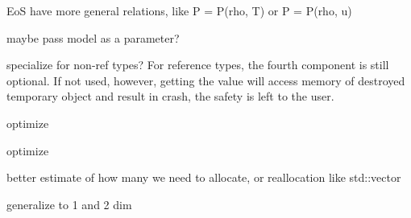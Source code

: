 
\begin{DoxyRefList}
\item[\label{todo__todo000018}%
\hypertarget{todo__todo000018}{}%
Member \hyperlink{classAbstract_1_1Eos_ab21906f5fc78370a10cdbf97983544ea}{Abstract\+:\+:Eos\+:\+:get\+Pressure} (Array\+View$<$ const Float $>$ rho, Array\+View$<$ const Float $>$ u, Array\+View$<$ Float $>$ p)=0]EoS have more general relations, like P = P(rho, T) or P = P(rho, u) 

maybe pass model as a parameter?  
\item[\label{todo__todo000008}%
\hypertarget{todo__todo000008}{}%
Class \hyperlink{classBasicIndices}{Basic\+Indices$<$ T $>$} ]specialize for non-\/ref types? For reference types, the fourth component is still optional. If not used, however, getting the value will access memory of destroyed temporary object and result in crash, the safety is left to the user.  
\item[\label{todo__todo000012}%
\hypertarget{todo__todo000012}{}%
Member \hyperlink{classBasicVector_3_01double_01_4_a9ef4881becf50b273cfae52c89fcd5fc}{Basic\+Vector$<$ double $>$\+:\+:dot} (const \hyperlink{classBasicVector}{Basic\+Vector} \&other) const]optimize  
\item[\label{todo__todo000011}%
\hypertarget{todo__todo000011}{}%
Member \hyperlink{classBasicVector_3_01double_01_4_a89893ab07524d683177877fc3f1a34d6}{Basic\+Vector$<$ double $>$\+:\+:operator==} (const \hyperlink{classBasicVector}{Basic\+Vector} \&v1, const \hyperlink{classBasicVector}{Basic\+Vector} \&v2)]optimize  
\item[\label{todo__todo000006}%
\hypertarget{todo__todo000006}{}%
Member \hyperlink{classBody_aefc7d09616d51ba1652a4a6940b06c5e}{Body\+:\+:add\+Angular\+Velocity} (const Vector \&U\+N\+U\+S\+E\+D(center), const Vector \&U\+N\+U\+S\+E\+D(axis))]
\item[\label{todo__todo000005}%
\hypertarget{todo__todo000005}{}%
Member \hyperlink{classBody_ad506a868ff9e989282cb948d44f35f42}{Body\+:\+:rotate} (const Vector \&U\+N\+U\+S\+E\+D(center), const Vector \&U\+N\+U\+S\+E\+D(axis))]
\item[\label{todo__todo000013}%
\hypertarget{todo__todo000013}{}%
Member \hyperlink{classCubicPacking_aa3c9a226ffa03b38a7b5fedad1414a01}{Cubic\+Packing\+:\+:generate} (const int n, const \hyperlink{classAbstract_1_1Domain}{Abstract\+::\+Domain} $\ast$domain) const override]better estimate of how many we need to allocate, or reallocation like std\+::vector  
\item[\label{todo__todo000014}%
\hypertarget{todo__todo000014}{}%
Member \hyperlink{classHexagonalPacking_a276079137928da5c94f8bb870b038c4a}{Hexagonal\+Packing\+:\+:generate} (const int n, const \hyperlink{classAbstract_1_1Domain}{Abstract\+::\+Domain} $\ast$domain) const override]generalize to 1 and 2 dim 


\end{DoxyRefList}
